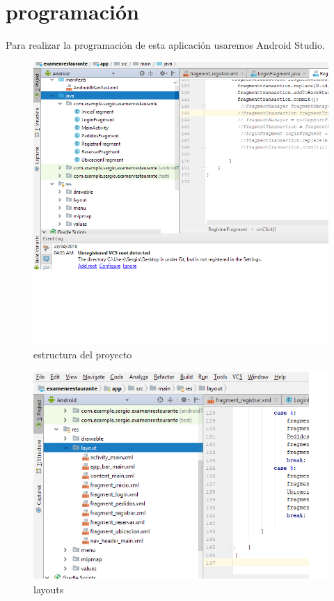 \section{programación}


Para realizar la programación de esta aplicación usaremos Android Studio.

\begin{figure}[H]
\caption{estructura del proyecto}
\centering
\includegraphics[scale=0.80]{imagenes/programacion}

\end{figure}

\begin{figure}[H]
\caption{layouts}
\centering
\includegraphics[scale=0.80]{imagenes/programacion2}

\end{figure}


